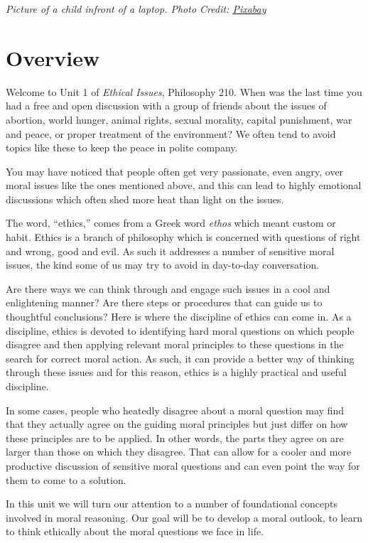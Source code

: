 \documentclass[
]{book}
\begin{document}
\emph{Picture of a child infront of a laptop. Photo Credit: \href{https://pixabay.com/en/baby-learn-laptop-question-2709666/}{Pixabay}}

\hypertarget{overview}{%
\section*{Overview}\label{overview}}

Welcome to Unit 1 of \emph{Ethical Issues}, Philosophy 210. When was the last time you had a free and open discussion with a group of friends about the issues of abortion, world hunger, animal rights, sexual morality, capital punishment, war and peace, or proper treatment of the environment? We often tend to avoid topics like these to keep the peace in polite company.

You may have noticed that people often get very passionate, even angry, over moral issues like the ones mentioned above, and this can lead to highly emotional discussions which often shed more heat than light on the issues.

The word, ``ethics,'' comes from a Greek word \emph{ethos} which meant custom or habit. Ethics is a branch of philosophy which is concerned with questions of right and wrong, good and evil. As such it addresses a number of sensitive moral issues, the kind some of us may try to avoid in day-to-day conversation.

Are there ways we can think through and engage such issues in a cool and enlightening manner? Are there steps or procedures that can guide us to thoughtful conclusions? Here is where the discipline of ethics can come in. As a discipline, ethics is devoted to identifying hard moral questions on which people disagree and then applying relevant moral principles to these questions in the search for correct moral action. As such, it can provide a better way of thinking through these issues and for this reason, ethics is a highly practical and useful discipline.

In some cases, people who heatedly disagree about a moral question may find that they actually agree on the guiding moral principles but just differ on how these principles are to be applied. In other words, the parts they agree on are larger than those on which they disagree. That can allow for a cooler and more productive discussion of sensitive moral questions and can even point the way for them to come to a solution.

In this unit we will turn our attention to a number of foundational concepts involved in moral reasoning. Our goal will be to develop a moral outlook, to learn to think ethically about the moral questions we face in life.
\end{document}
